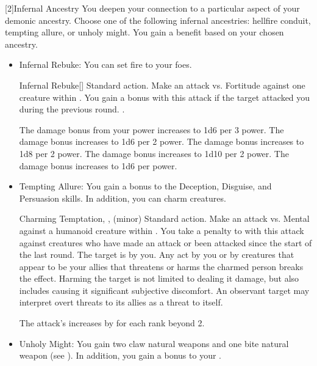     [2]{Infernal Ancestry} You deepen your connection to a particular aspect of your demonic ancestry.
      Choose one of the following infernal ancestries: hellfire conduit, tempting allure, or unholy might.
      You gain a benefit based on your chosen ancestry.
      \begin{itemize}
        \item Infernal Rebuke: You can set fire to your foes.
          \begin{magicalactiveability}{Infernal Rebuke}[\atFire]
            \abilityusagetime Standard action.
            \rankline
            Make an attack vs. Fortitude against one creature within \shortrange.
            You gain a   bonus with this attack if the target attacked you during the previous round.
            \hit \damagerankthree.

            \rankline
             The damage bonus from your power increases to 1d6 per 3 power.
             The damage bonus increases to 1d6 per 2 power.
             The damage bonus increases to 1d8 per 2 power.
             The damage bonus increases to 1d10 per 2 power.
             The damage bonus increases to 1d6 per power.
          \end{magicalactiveability}
        \item Tempting Allure: You gain a  bonus to the Deception, Disguise, and Persuasion skills.
          In addition, you can charm creatures.
          \begin{magicalsustainability}{Charming Temptation}{, ,  (minor)}
            \abilityusagetime Standard action.
            \rankline
            Make an attack vs. Mental against a humanoid creature within \medrange.
            You take a  penalty to  with this attack against creatures who have made an attack or been attacked since the start of the last round.
            \hit The target is \charmed by you.
            Any act by you or by creatures that appear to be your allies that threatens or harms the charmed person breaks the effect.
            Harming the target is not limited to dealing it damage, but also includes causing it significant subjective discomfort.
            An observant target may interpret overt threats to its allies as a threat to itself.

            \rankline
            The attack's  increases by  for each rank beyond 2.
          \end{magicalsustainability}
        \item Unholy Might: You gain two claw natural weapons and one bite natural weapon (see ).
          In addition, you gain a  bonus to your .
      \end{itemize}

